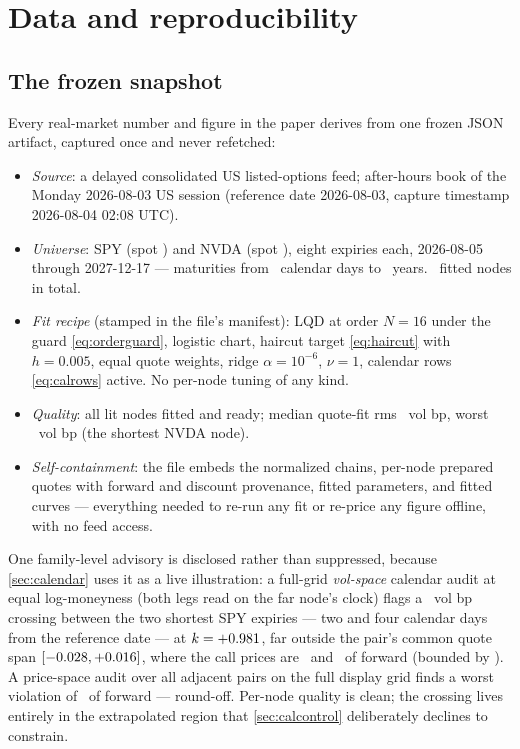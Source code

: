 \section{Data and reproducibility}
\label{app:data}

\subsection{The frozen snapshot}

Every real-market number and figure in the paper derives from one frozen
JSON artifact, captured once and never refetched:

\begin{itemize}[leftmargin=1.6em]
\item \emph{Source}: a delayed consolidated US listed-options feed;
after-hours book of the Monday 2026-08-03 US session (reference date
2026-08-03, capture timestamp 2026-08-04 02:08 UTC).
\item \emph{Universe}: SPY (spot \MacSpySpot) and NVDA (spot
\MacNvdaSpot), eight expiries each, 2026-08-05 through 2027-12-17 ---
maturities from \MacNvdaOneDayDays\ calendar days to
\MacNvdaLongTYears\ years.  \MacSnapNodeCount\ fitted nodes in total.
\item \emph{Fit recipe} (stamped in the file's manifest): LQD at order
$N=16$ under the guard \eqref{eq:orderguard}, logistic chart, haircut
target \eqref{eq:haircut} with $h=0.005$, equal quote weights, ridge
$\alpha=10^{-6}$, $\nu=1$, calendar rows \eqref{eq:calrows} active.  No
per-node tuning of any kind.
\item \emph{Quality}: all lit nodes fitted and ready; median quote-fit
rms \MacSnapMedianRmsBp\ vol bp, worst \MacSnapWorstRmsBp\ vol bp (the
shortest NVDA node).
\item \emph{Self-containment}: the file embeds the normalized chains,
per-node prepared quotes with forward and discount provenance, fitted
parameters, and fitted curves --- everything needed to re-run any fit or
re-price any figure offline, with no feed access.
\end{itemize}

One family-level advisory is disclosed rather than suppressed, because
\cref{sec:calendar} uses it as a live illustration: a full-grid
\emph{vol-space} calendar audit at equal log-moneyness (both legs read
on the far node's clock) flags a \MacCalGapVolBp\ vol bp crossing
between the two shortest SPY expiries --- two and four calendar days
from the reference date --- at $k=+0.981$, far outside the
pair's common quote span $[-0.028,+0.016]$, where the
call prices are \MacCalendarCallShort\ and \MacCalendarCallLong\ of
forward (bounded by \MacCalWingPriceOrder).  A price-space audit over
all adjacent pairs on the full display grid finds a worst violation of
\MacCalPriceGridWorst\ of forward --- round-off.  Per-node quality is
clean; the crossing lives entirely in the extrapolated region that
\cref{sec:calcontrol} deliberately declines to constrain.

